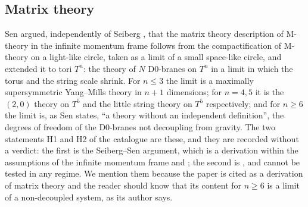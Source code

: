 \subsection{Matrix theory}\label{ssec:matrix}

Sen \cite{Sen98matrix} argued, independently of Seiberg \cite{Seiberg97}, that the matrix theory description of M-theory in the infinite momentum frame follows from the compactification of M-theory on a light-like circle, taken as a limit of a small space-like circle, and extended it to tori $T^n$: the theory of $N$ D0-branes on $T^n$ in a limit in which the torus and the string scale shrink. For $n\le 3$ the limit is a maximally supersymmetric Yang--Mills theory in $n+1$ dimensions; for $n=4,5$ it is the $(2,0)$ theory on $T^5$ and the little string theory on $T^5$ respectively; and for $n\ge6$ the limit is, as Sen states, ``a theory without an independent definition'', the degrees of freedom of the D0-branes not decoupling from gravity. The two statements H1 and H2 of the catalogue are these, and they are recorded without a verdict: the first is the Seiberg--Sen argument, which is a derivation within the assumptions of the infinite momentum frame and ; the second is , and cannot be tested in any regime. We mention them because the paper is cited as a derivation of matrix theory and the reader should know that its content for $n\ge6$ is a limit of a non-decoupled system, as its author says.
